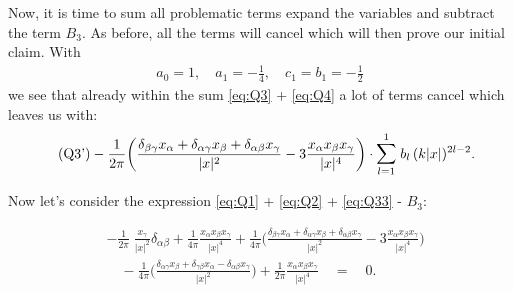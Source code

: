 Now, it is time to sum all problematic terms expand the variables and subtract the term $B_3$. 
As before, all the terms will cancel which will then prove our initial claim. 
With
\begin{align*}
  a_0 = 1, \quad a_1 = -\frac{1}{4}, \quad c_1 = b_1 =  -\frac{1}{2}
\end{align*}
we see that already within the sum \eqref{eq:Q3} + \eqref{eq:Q4} a lot of terms cancel which leaves us with:
\begin{align*}
  \label{eq:Q33}
  \tag{Q3'}
  &- \frac{1}{2\pi} \bigg(\frac{\delta_{\beta\gamma} x_\alpha + \delta_{\alpha \gamma} x_\beta + \delta_{\alpha \beta} x_\gamma}{|x|^2} - 3 \frac{x_\alpha x_\beta x_\gamma}{|x|^4} \bigg) 
  \cdot \mathlarger{\sum}_{l = 1}^1 \; b_l \, (k|x|)^{2l - 2}.
\end{align*}

Now let's consider the expression \eqref{eq:Q1} + \eqref{eq:Q2} + \eqref{eq:Q33} - $B_3$:

\begin{align*}
  &-\frac{1}{2\pi} \;  \frac{x_\gamma}{|x|^2} \delta_{\alpha\beta}
  + \frac{1}{4 \pi } \frac{x_\alpha x_\beta x_\gamma}{|x|^4} 
  + \frac{1}{4\pi} \bigg(\frac{\delta_{\beta\gamma} x_\alpha + \delta_{\alpha \gamma} x_\beta + \delta_{\alpha \beta} x_\gamma}{|x|^2} - 3 \frac{x_\alpha x_\beta x_\gamma}{|x|^4} \bigg) 
   \\[0.5em]
 &\quad - \frac{1}{4 \pi} \bigg( \frac{\delta_{\alpha\gamma} x_\beta + \delta_{\gamma\beta} x_\alpha  - \delta_{\alpha\beta} x_\gamma}{|x|^2}  \bigg) 
  + \frac{1}{2\pi} \frac{x_\alpha x_\beta x_\gamma}{|x|^4}
  \quad = \quad 0.
\end{align*}
